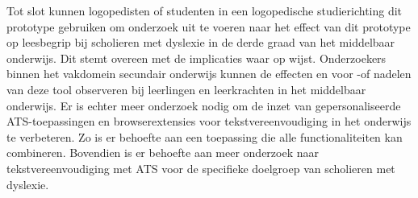 \medspace

Tot slot kunnen logopedisten of studenten in een logopedische studierichting dit prototype gebruiken om onderzoek uit te voeren naar het effect van dit prototype op leesbegrip bij scholieren met dyslexie in de derde graad van het middelbaar onderwijs. Dit stemt overeen met de implicaties waar \textcite{Gooding2022} op wijst. Onderzoekers binnen het vakdomein secundair onderwijs kunnen de effecten en voor -of nadelen van deze tool observeren bij leerlingen en leerkrachten in het middelbaar onderwijs. Er is echter meer onderzoek nodig om de inzet van gepersonaliseerde ATS-toepassingen en browserextensies voor tekstvereenvoudiging in het onderwijs te verbeteren. Zo is er behoefte aan een toepassing die alle functionaliteiten kan combineren. Bovendien is er behoefte aan meer onderzoek naar tekstvereenvoudiging met ATS voor de specifieke doelgroep van scholieren met dyslexie.